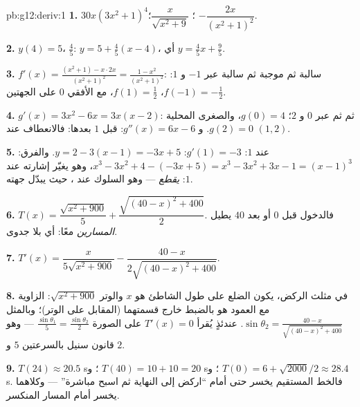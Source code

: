 \begin{solution}{pb:g12:deriv:1}
\textbf{1.} $30x\left(3x^2 + 1\right)^4$؛ \quad
$\dfrac{x}{\sqrt{x^2 + 9}}$؛ \quad
$-\dfrac{2x}{\left(x^2 + 1\right)^2}$.

\textbf{2.} $y(4) = 5$،  $\frac45$: 
$y = 5 + \frac45(x - 4)$، أي $y = \frac45 x + \frac95$.

\textbf{3.} $f'(x) = \frac{(x^2 + 1) - x \cdot 2x}{(x^2+1)^2}
= \frac{1 - x^2}{(x^2 + 1)^2}$: سالبة ثم موجبة ثم سالبة
عبر $-1$ و $1$:  $f(-1) = -\frac12$، 
$f(1) = \frac12$، مع  الأفقي $0$ على الجهتين.

\textbf{4.} $g'(x) = 3x^2 - 6x = 3x(x - 2)$:  ثم
 ثم  عبر $0$ و $2$؛ 
$g(0) = 4$، والصغرى المحلية $g(2) = 0$. و $g''(x) = 6x - 6$: 
قبل $1$  بعدها: فالانعطاف عند $(1, 2)$.

\textbf{5.}  عند $1$:  $g'(1) = -3$:
$y = 2 - 3(x - 1) = -3x + 5$. والفرق:
$x^3 - 3x^2 + 4 - (-3x + 5) = x^3 - 3x^2 + 3x - 1 =
(x - 1)^3$، وهو يغيّر إشارته عند $1$: 
\emph{يقطع}  --- وهو السلوك  عند
، حيث يبدّل  جهته.

\textbf{6.} $T(x) = \dfrac{\sqrt{x^2 + 900}}{5} +
\dfrac{\sqrt{(40 - x)^2 + 400}}{2}$. فالدخول قبل $0$ أو
بعد $40$ يطيل \emph{المسارين} معًا: أي بلا جدوى.

\textbf{7.} $T'(x) = \dfrac{x}{5\sqrt{x^2 + 900}} -
\dfrac{40 - x}{2\sqrt{(40 - x)^2 + 400}}$.

\textbf{8.} في مثلث الركض، يكون الضلع على طول الشاطئ
هو $x$ والوتر $\sqrt{x^2 + 900}$: 
الزاوية مع العمود هو بالضبط خارج قسمتهما
(المقابل على الوتر)؛ وبالمثل
$\sin\theta_2 = \frac{40 - x}{\sqrt{(40-x)^2 + 400}}$. عندئذٍ
يُقرأ $T'(x) = 0$ على الصورة
$\frac{\sin\theta_1}{5} = \frac{\sin\theta_2}{2}$ --- وهو قانون
سنيل بالسرعتين $5$ و $2$.

\textbf{9.} $T(24) \approx 20.5$ s؛ و $T(40) = 10 + 10 = 20$ s؛
و $T(0) = 6 + \sqrt{2000}/2 \approx 28.4$ s. فالخط المستقيم
يخسر حتى أمام ``اركض إلى النهاية ثم اسبح مباشرة'' ---
وكلاهما يخسر أمام المسار المنكسر.


\end{solution}
